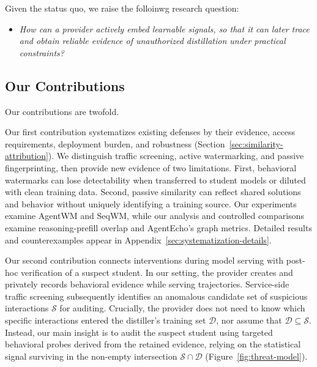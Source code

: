 Given the status quo, we raise the folloinwg research question:

\begin{itemize}
    \item[] \textit{How can a provider actively embed learnable signals, so that it can later
    trace and obtain reliable evidence of unauthorized distillation under practical constraints?}
\end{itemize}

\subsection{Our Contributions}
\label{sec:intro-contributions}

Our contributions are twofold.

Our first contribution systematizes existing defenses by their evidence, access requirements, deployment burden, and robustness (Section~\ref{sec:similarity-attribution}). We distinguish traffic screening, active watermarking, and passive fingerprinting, then provide new evidence of two limitations. First, behavioral watermarks can lose detectability when transferred to student models or diluted with clean training data. Second, passive similarity can reflect shared solutions and behavior without uniquely identifying a training source. Our experiments examine AgentWM and SeqWM, while our analysis and controlled comparisons examine reasoning-prefill overlap and AgentEcho's graph metrics. Detailed results and counterexamples appear in Appendix~\ref{sec:systematization-details}.

Our second contribution connects interventions during model serving with post-hoc verification of a suspect student. In our setting, the provider creates and privately records behavioral evidence while serving trajectories. Service-side traffic screening subsequently identifies an anomalous candidate set of suspicious interactions $\mathcal{S}$ for auditing. Crucially, the provider does not need to know which specific interactions entered the distiller's training set $\mathcal{D}$, nor assume that $\mathcal{D} \subseteq \mathcal{S}$. Instead, our main insight is to audit the suspect student using targeted behavioral probes derived from the retained evidence, relying on the statistical signal surviving in the non-empty intersection $\mathcal{S} \cap \mathcal{D}$ (Figure~\ref{fig:threat-model}).

